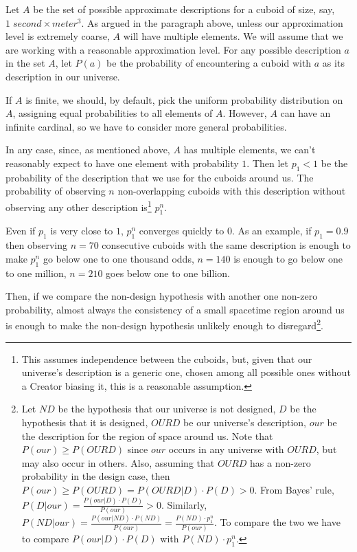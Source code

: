 \documentclass[a4paper
,draft
]{article}
\def\our_description{OURD}
\begin{document}
Let $A$ be the set of possible approximate descriptions for
a cuboid of size, say, $1\;second \times meter^3$.
As argued in the paragraph above,
unless our approximation level is extremely coarse,
$A$ will have multiple elements.
We will assume that we are working with a reasonable approximation level.
For any possible description $a$ in the set $A$,
let $P(a)$ be the probability of encountering
a cuboid with $a$ as its description in our universe.

If $A$ is finite, we should, by default, pick the uniform probability
distribution on $A$, assigning equal probabilities to all elements of $A$.
However, $A$ can have an infinite cardinal,
so we have to consider more general probabilities.

In any case, since, as mentioned above, $A$ has multiple elements,
we can't reasonably expect to have one element with probability $1$.
Then let $p_1<1$ be the probability of the description that we use for the
cuboids around us.
The probability of observing $n$
non-overlapping cuboids
with this description without observing any other description is\footnote{
  This assumes independence between the cuboids, but, given that our
  universe's description is a generic one, chosen among all possible
  ones without a Creator biasing it, this is a reasonable assumption.
}
$p_1^n$.

Even if $p_1$ is very close to $1$, $p_1^n$ converges quickly to 0.
As an example, if $p_1=0.9$ then observing $n=70$ consecutive cuboids with
the same description is enough to make $p_1^n$ go below one to one thousand
odds, $n=140$ is enough to go below one to one million,
$n=210$ goes below one to one billion.

Then, if we compare the non-design hypothesis
with another one non-zero probability,
almost always the consistency of a small spacetime region around us is enough
to make the non-design hypothesis unlikely enough to disregard\footnote{
  Let $ND$ be the hypothesis that our universe is not designed,
  $D$ be the hypothesis that it is designed, $\our_description$ be our
  universe's description,
  $our$ be the description for the region of space around us.
  Note that $P(our) \ge P(\our_description)$ since $our$ occurs in any
  universe with $\our_description$, but may also occur in others. Also, assuming
  that $\our_description$ has a non-zero probability in the design case, then
  $P(our) \ge P(\our_description)=P(\our_description|D)\cdot P(D) > 0$.
  From Bayes' rule, $P(D|our) = \frac{P(our|D)\cdot P(D)}{P(our)} > 0$.
  Similarly,
  $P(ND|our) = \frac{P(our|ND)\cdot P(ND)}{P(our)}
    = \frac{P(ND) \cdot p_1^n}{P(our)}$.
  To compare the two we have to compare
  $P(our|D)\cdot P(D)$ with $P(ND) \cdot p_1^n$.
  }.
\end{document}
